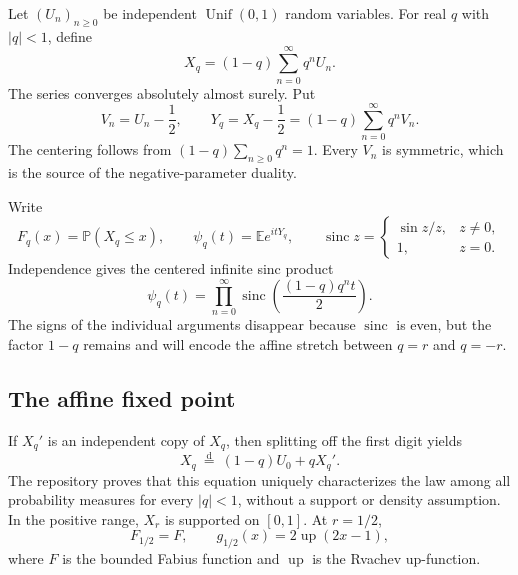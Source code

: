 \documentclass[11pt]{article}
\theoremstyle{definition}
\newcommand{\E}{\mathbb E}
\newcommand{\Pp}{\mathbb P}
\newcommand{\Up}{\operatorname{up}}
\newcommand{\sinc}{\operatorname{sinc}}
\newcommand{\doteqL}{\mathrel{\stackrel{\mathrm d}=}}
\begin{document}
Let \((U_n)_{n\ge0}\) be independent \(\operatorname{Unif}(0,1)\) random variables.  For
real \(q\) with \(\lvert q\rvert<1\), define
\begin{equation}
 X_q=(1-q)\sum_{n=0}^{\infty}q^nU_n.                 \label{eq:Xq-def}
\end{equation}
The series converges absolutely almost surely.  Put
\begin{equation}
 V_n=U_n-\frac12,
 \qquad
 Y_q=X_q-\frac12=(1-q)\sum_{n=0}^{\infty}q^nV_n.     \label{eq:Yq-def}
\end{equation}
The centering follows from \((1-q)\sum_{n\ge0}q^n=1\).  Every \(V_n\) is symmetric,
which is the source of the negative-parameter duality.

Write
\[
 F_q(x)=\Pp(X_q\le x),
 \qquad
 \psi_q(t)=\E e^{itY_q},
 \qquad
 \sinc z=\begin{cases}\sin z/z,&z\ne0,\\1,&z=0.\end{cases}
\]
Independence gives the centered infinite sinc product
\begin{equation}
 \psi_q(t)=\prod_{n=0}^{\infty}
 \sinc\!\left(\frac{(1-q)q^nt}{2}\right).             \label{eq:psi-product}
\end{equation}
The signs of the individual arguments disappear because \(\sinc\) is even, but the
factor \(1-q\) remains and will encode the affine stretch between \(q=r\) and \(q=-r\).

\subsection{The affine fixed point}

If \(X_q'\) is an independent copy of \(X_q\), then splitting off the first digit yields
\begin{equation}
 X_q\ \doteqL\ (1-q)U_0+qX_q'.                       \label{eq:affine-fixed-point}
\end{equation}
The repository proves that this equation uniquely characterizes the law among all
probability measures for every \(\lvert q\rvert<1\), without a support or density
assumption.  In the positive range, \(X_r\) is supported on \([0,1]\).  At \(r=1/2\),
\begin{equation}
 F_{1/2}=F,
 \qquad
 g_{1/2}(x)=2\Up(2x-1),                                \label{eq:half-bridge}
\end{equation}
where \(F\) is the bounded Fabius function and \(\Up\) is the Rvachev up-function.
\end{document}
